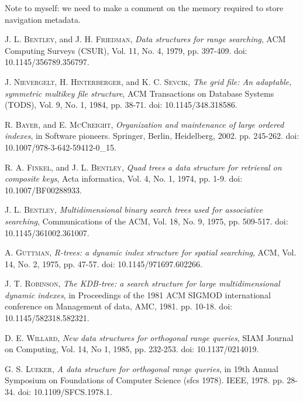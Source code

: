 \documentclass[preprint,12pt]{elsarticle}
\begin{document}
Note to myself: we need to make a comment on the memory required to store navigation metadata.

\begin{thebibliography}{00}


 \textsc{J. L. Bentley}, and \textsc{J. H. Friedman},
\textit{Data structures for range searching}, ACM Computing Surveys (CSUR), Vol. 11, No. 4, 1979, pp. 397-409. doi: 10.1145/356789.356797.

 \textsc{J. Nievergelt, H. Hinterberger}, and \textsc{K. C. Sevcik},
\textit{The grid file: An adaptable, symmetric multikey file structure}, ACM Transactions on Database Systems (TODS), Vol. 9, No. 1, 1984, pp. 38-71. doi: 10.1145/348.318586.

 \textsc{R. Bayer}, and \textsc{E. McCreight},
\textit{Organization and maintenance of large ordered indexes}, in Software pioneers. Springer, Berlin, Heidelberg, 2002. pp. 245-262. doi: 10.1007/978-3-642-59412-0\_15.

 \textsc{R. A. Finkel}, and \textsc{J. L. Bentley},
\textit{Quad trees a data structure for retrieval on composite keys}, Acta informatica, Vol. 4, No. 1, 1974, pp. 1-9. doi: 10.1007/BF00288933.

 \textsc{J. L. Bentley},
\textit{Multidimensional binary search trees used for associative searching}, Communications of the ACM, Vol. 18, No. 9, 1975, pp. 509-517. doi: 10.1145/361002.361007.

 \textsc{A. Guttman},
\textit{R-trees: a dynamic index structure for spatial searching}, ACM, Vol. 14, No. 2, 1975, pp. 47-57. doi: 10.1145/971697.602266.

 \textsc{J. T. Robinson},
\textit{The KDB-tree: a search structure for large multidimensional dynamic indexes}, in Proceedings of the 1981 ACM SIGMOD international conference on Management of data, AMC, 1981. pp. 10-18. doi: 10.1145/582318.582321.

 \textsc{D. E. Willard},
\textit{New data structures for orthogonal range queries}, SIAM Journal on Computing, Vol. 14, No 1, 1985, pp. 232-253. doi: 10.1137/0214019.

 \textsc{G. S. Lueker},
\textit{A data structure for orthogonal range queries}, in 19th Annual Symposium on Foundations of Computer Science (sfcs 1978). IEEE, 1978. pp. 28-34. doi: 10.1109/SFCS.1978.1.


\end{thebibliography}
\end{document}
